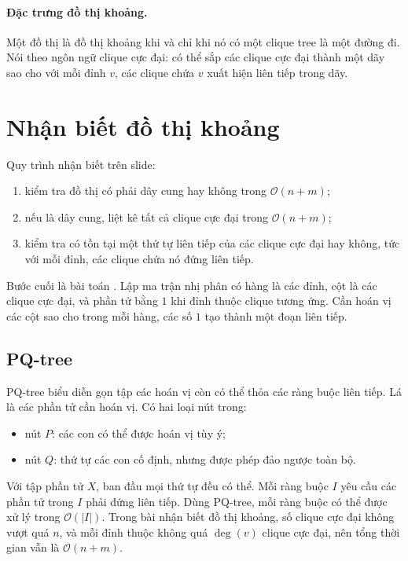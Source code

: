 \documentclass[11pt]{article}
\newcommand{\Oh}{\mathcal{O}}
\begin{document}
\paragraph{Đặc trưng đồ thị khoảng.}
Một đồ thị là đồ thị khoảng khi và chỉ khi nó có một clique tree là một
đường đi. Nói theo ngôn ngữ clique cực đại: có thể sắp các clique cực đại
thành một dãy sao cho với mỗi đỉnh \(v\), các clique chứa \(v\) xuất hiện
liên tiếp trong dãy.

\section{Nhận biết đồ thị khoảng}

Quy trình nhận biết trên slide:
\begin{enumerate}
  \item kiểm tra đồ thị có phải dây cung hay không trong \(\Oh(n+m)\);
  \item nếu là dây cung, liệt kê tất cả clique cực đại trong \(\Oh(n+m)\);
  \item kiểm tra có tồn tại một thứ tự liên tiếp của các clique cực đại hay
  không, tức với mỗi đỉnh, các clique chứa nó đứng liên tiếp.
\end{enumerate}

Bước cuối là bài toán . Lập ma trận nhị
phân có hàng là các đỉnh, cột là các clique cực đại, và phần tử bằng \(1\)
khi đỉnh thuộc clique tương ứng. Cần hoán vị các cột sao cho trong mỗi hàng,
các số \(1\) tạo thành một đoạn liên tiếp.

\subsection{PQ-tree}

PQ-tree biểu diễn gọn tập các hoán vị còn có thể thỏa các ràng buộc liên
tiếp. Lá là các phần tử cần hoán vị. Có hai loại nút trong:
\begin{itemize}
  \item nút \(P\): các con có thể được hoán vị tùy ý;
  \item nút \(Q\): thứ tự các con cố định, nhưng được phép đảo ngược toàn bộ.
\end{itemize}

Với tập phần tử \(X\), ban đầu mọi thứ tự đều có thể. Mỗi ràng buộc \(I\)
yêu cầu các phần tử trong \(I\) phải đứng liên tiếp. Dùng PQ-tree, mỗi ràng
buộc có thể được xử lý trong \(\Oh(|I|)\). Trong bài nhận biết đồ thị khoảng,
số clique cực đại không vượt quá \(n\), và mỗi đỉnh thuộc không quá
\(\deg(v)\) clique cực đại, nên tổng thời gian vẫn là \(\Oh(n+m)\).
\end{document}
